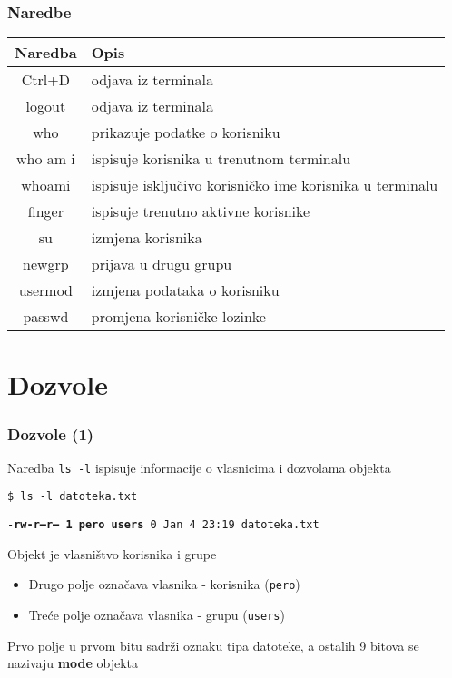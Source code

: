 \documentclass[table,usenames,dvipsnames] {beamer}
\newcommand{\shell}[1]{\texttt{#1}}
\begin{document}
\begin{frame}[t]
	\frametitle{Naredbe}
	\begin{table}[h]
		\begin{tabular}{|c|l|}
			\hline
			\rowcolor{BlueViolet!20}Naredba & Opis \\
			\hline
			Ctrl+D & odjava iz terminala \\
			\hline
			logout & odjava iz terminala \\
			\hline
			who & prikazuje podatke o korisniku \\
			\hline
			who am i & ispisuje korisnika u trenutnom terminalu \\
			\hline
			whoami & ispisuje isključivo korisničko ime korisnika u terminalu \\
			\hline
			finger & ispisuje trenutno aktivne korisnike \\
			\hline
			su & izmjena korisnika \\
			\hline
			newgrp & prijava u drugu grupu \\
			\hline
			usermod & izmjena podataka o korisniku \\
			\hline
			passwd & promjena korisničke lozinke \\
			\hline
		\end{tabular}
	\end{table}
\end{frame}

\section{Dozvole}
\begin{frame}[t]
\frametitle{Dozvole (1)}
\begin{itemize}
  \item Naredba \shell{ls -l} ispisuje informacije o vlasnicima i dozvolama objekta
  {\small \item[] \shell{\$ ls -l datoteka.txt}
  \item[] \shell{-\textbf{rw-r--r-- 1 pero users} 0 Jan  4 23:19 datoteka.txt}}
  \vfill
    \item Objekt je vlasništvo korisnika i grupe
    \begin{itemize}
    \item Drugo polje označava vlasnika - korisnika \hfill (\shell{pero}) \hfill \,
    \item Treće polje označava vlasnika - grupu \hfill (\shell{users}) \hfill \,
    \end{itemize}
    \item Prvo polje u prvom bitu sadrži oznaku tipa datoteke, a ostalih 9 bitova se nazivaju \textbf{mode} objekta
  \end{itemize}
\end{frame}
\end{document}
